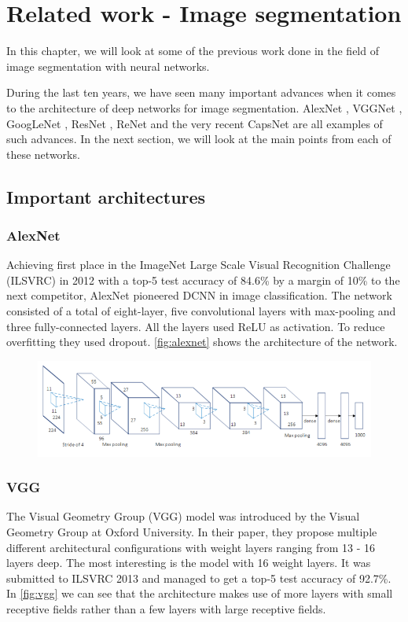 \chapter{Related work - Image segmentation}\label{sec:previous-work-segmentation}
In this chapter, we will look at some of the previous work done in the field of image segmentation with neural networks. 

During the last ten years, we have seen many important advances when it comes to the architecture of deep networks for image segmentation. AlexNet \cite{Krizhevsky2012}, VGGNet \cite{Simonyan2014a}, GoogLeNet \cite{Szegedy2014}, ResNet \cite{He2015}, ReNet \cite{Visin2015} and the very recent CapsNet \cite{Sabour2017} are all examples of such advances. In the next section, we will look at the main points from each of these networks.

\section{Important architectures}\label{sec:important-architectures}

\subsection{AlexNet}
Achieving first place in the ImageNet Large Scale Visual Recognition Challenge (ILSVRC) \cite{Russakovsky2015}  in 2012 with a top-5 test accuracy of 84.6\% by a margin of 10\% to the next competitor, AlexNet pioneered DCNN in image classification. The network consisted of a total of eight-layer, five convolutional layers with max-pooling and three fully-connected layers. All the layers used ReLU as activation. To reduce overfitting they used dropout. \autoref{fig:alexnet} shows the architecture of the network.

\begin{figure}[H]
    \centering
    \includegraphics[width=0.7\linewidth]{fig/alexnet.png}
    \label{fig:alexnet}
\end{figure}


\subsection{VGG}
The Visual Geometry Group (VGG) model was introduced by the Visual Geometry Group at Oxford University. In their paper, they propose multiple different architectural configurations with weight layers ranging from 13 - 16 layers deep. The most interesting is the model with 16 weight layers. It was submitted to ILSVRC 2013 and managed to get a top-5 test accuracy of 92.7\%. In \autoref{fig:vgg} we can see that the architecture makes use of more layers with small receptive fields rather than a few layers with large receptive fields.

